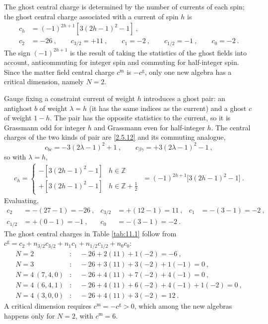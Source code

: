 The ghost central charge is determined by the number of currents of each spin; the ghost central charge associated with a current of spin $h$ is
\begin{subequations}
	\begin{align}
		c_{h}&=(-1)^{2h+1}[3(2h-1)^{2}-1] \: , \label{11.1.2a} \\
		c_{2}&=-26\:,\qquad c_{3/2}=+11\:,\qquad c_{1}=-2\:,\qquad c_{1/2}=-1\:, \qquad c_{0}=-2\:. \label{11.1.2b}
	\end{align} \label{11.1.2}
\end{subequations}
The sign $(-1)^{2h+1}$ is the result of taking the statistics of the ghost fields into account, anticommuting for integer spin and commuting for half-integer spin. Since the matter field central charge $c^{\text{m}}$ is $-c^{\text{g}}$, only one new algebra has a critical dimension, namely $N=2$.
\begin{tcolorbox}[breakable]
	\begin{remark}
		Gauge fixing a constraint current of weight $h$ introduces a ghost pair: an antighost $b$ of weight $\lambda=h$ (it has the same indices as the current) and a ghost $c$ of weight $1-h$. The pair has the opposite statistics to the current, so it is Grassmann odd for integer $h$ and Grassmann even for half-integer $h$. The central charges of the two kinds of pair are \eqref{2.5.12} and its commuting analogue,
		\begin{equation*}
			c_{bc}=-3(2\lambda-1)^{2}+1\:,\qquad c_{\beta\gamma}=+3(2\lambda-1)^{2}-1\:,
		\end{equation*}
		so with $\lambda=h$,
		\begin{align*}
			c_{h}=\begin{cases} -[3(2h-1)^{2}-1] & h\in\mathds{Z} \\ +[3(2h-1)^{2}-1] & h\in\mathds{Z}+\tfrac{1}{2}\end{cases}
			\;=(-1)^{2h+1}\bigl[3(2h-1)^{2}-1\bigr]\:.
		\end{align*}
		Evaluating,
		\begin{align*}
			c_{2}&=-(27-1)=-26\:,& c_{3/2}&=+(12-1)=11\:,& c_{1}&=-(3-1)=-2\:,\\
			c_{1/2}&=+(0-1)=-1\:,& c_{0}&=-(3-1)=-2\:.
		\end{align*}
		The ghost central charges in Table \ref{tab:11.1} follow from $c^{\text{g}}=c_{2}+n_{3/2}c_{3/2}+n_{1}c_{1}+n_{1/2}c_{1/2}+n_{0}c_{0}$:
		\begin{align*}
			N=2&: \quad -26+2(11)+1(-2)=-6\:, \\
			N=3&: \quad -26+3(11)+3(-2)+1(-1)=0\:, \\
			N=4\ (7,4,0)&: \quad -26+4(11)+7(-2)+4(-1)=0\:, \\
			N=4\ (6,4,1)&: \quad -26+4(11)+6(-2)+4(-1)+1(-2)=0\:, \\
			N=4\ (3,0,0)&: \quad -26+4(11)+3(-2)=12\:.
		\end{align*}
		A critical dimension requires $c^{\text{m}}=-c^{\text{g}}>0$, which among the new algebras happens only for $N=2$, with $c^{\text{m}}=6$.
	\end{remark}
\end{tcolorbox}

